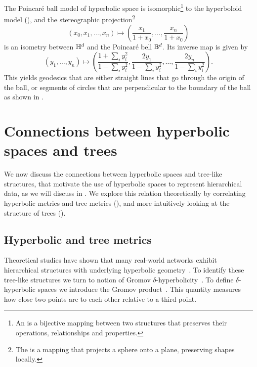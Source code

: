 

The Poincaré ball model of hyperbolic space is isomorphic\footnote{An  is a bijective mapping between two structures that preserves their operations, relationships and properties.} to the hyperboloid model (), and the stereographic projection\footnote{The  is a mapping that projects a sphere onto a plane, preserving shapes locally.}
\begin{equation*}
    (x_0, x_1, \ldots, x_n) \mapsto \left(\frac{x_1}{1+x_0}, \ldots, \frac{x_n}{1+x_0}\right)
\end{equation*}
is an isometry between $\mathbb{H}^d$ and the Poincaré bell $\mathbb{B}^d$. Its inverse map is given by
\begin{equation*}
    (y_1, \ldots, y_n) \mapsto \left(\frac{1 + \sum_i y_i^2}{1 - \sum_i y_i^2}, \frac{2y_1}{1 - \sum_i y_i^2}, \ldots, \frac{2y_n}{1 - \sum_i y_i^2}\right).
\end{equation*}
This yields geodesics that are either straight lines that go through the origin of the ball, or segments of circles that are perpendicular to the boundary of the ball as shown in .



\section{Connections between hyperbolic spaces and trees}
We now discuss the connections between hyperbolic spaces and tree-like structures, that motivate the use of hyperbolic spaces to represent hierarchical data, as we will discuss in . We explore this relation theoretically by correlating hyperbolic metrics and tree metrics (), and more intuitively looking at the structure of trees ().

\subsection{Hyperbolic and tree metrics}\label{sec:hyperbolicTreeMetrics}
Theoretical studies have shown that many real-world networks exhibit hierarchical structures with underlying hyperbolic geometry~\cite{Krioukov2010HyperbolicGeometryComplexNetworks}\cite{Papadopoulos2012popularityVSSimilarityGrowingNetworks}. To identify these tree-like structures we turn to notion of Gromov $\delta$-hyperbolicity~\cite{gromov1987hyperbolic}\cite{adcock2013tree}\cite{chen2013hyperbolicity}. To define $\delta$-hyperbolic spaces we introduce the Gromov product~\cite{gromov1987hyperbolic}. This quantity measures how close two points are to each other relative to a third point.  

